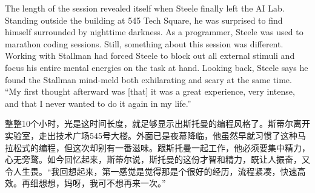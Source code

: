 \ifdefined\eng
The length of the session revealed itself when Steele finally left the AI Lab. Standing outside the building at 545 Tech Square, he was surprised to find himself surrounded by nighttime darkness. As a programmer, Steele was used to marathon coding sessions. Still, something about this session was different. Working with Stallman had forced Steele to block out all external stimuli and focus his entire mental energies on the task at hand. Looking back, Steele says he found the Stallman mind-meld both exhilarating and scary at the same time. ``My first thought afterward was [that] it was a great experience, very intense, and that I never wanted to do it again in my life.''
\fi

\ifdefined\chs
整整10个小时，光是这时间长度，就足够显示出斯托曼的编程风格了。斯蒂尔离开实验室，走出技术广场545号大楼。外面已是夜幕降临，他虽然早就习惯了这种马拉松式的编程，但这次却别有一番滋味。跟斯托曼一起工作，他必须要集中精力，心无旁鹜。如今回忆起来，斯蒂尔说，斯托曼的这份才智和精力，既让人振奋，又令人生畏。``我回想起来，第一感觉是觉得那是个很好的经历，流程紧凑，快速高效。再细想想，妈呀，我可不想再来一次。''
\fi

\theendnotes
\setcounter{endnote}{0}
